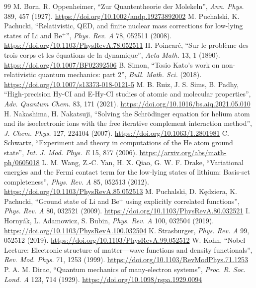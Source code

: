 {\begin{thebibliography}{99}
 M. Born, R. Oppenheimer, ``Zur Quantentheorie der Molekeln'', \emph{Ann. Phys.} 389, 457 (1927). \url{https://doi.org/10.1002/andp.19273892002}
 M. Puchalski, K. Pachucki, ``Relativistic, QED, and finite nuclear mass corrections for low-lying states of Li and Be$^+$'', \emph{Phys. Rev. A} 78, 052511 (2008). \url{https://doi.org/10.1103/PhysRevA.78.052511}
 H. Poincaré, ``Sur le problème des trois corps et les équations de la dynamique'', \emph{Acta Math.} 13, 1 (1890). \url{https://doi.org/10.1007/BF02392506}
 B. Simon, ``Tosio Kato's work on non-relativistic quantum mechanics: part 2'', \emph{Bull. Math. Sci.} (2018). \url{https://doi.org/10.1007/s13373-018-0121-5}
 M. B. Ruiz, J. S. Sims, B. Padhy, ``High-precision Hy-CI and E-Hy-CI studies of atomic and molecular properties'', \emph{Adv. Quantum Chem.} 83, 171 (2021). \url{https://doi.org/10.1016/bs.aiq.2021.05.010}
 H. Nakashima, H. Nakatsuji, ``Solving the Schrödinger equation for helium atom and its isoelectronic ions with the free iterative complement interaction method'', \emph{J. Chem. Phys.} 127, 224104 (2007). \url{https://doi.org/10.1063/1.2801981}
 C. Schwartz, ``Experiment and theory in computations of the He atom ground state'', \emph{Int. J. Mod. Phys. E} 15, 877 (2006). \url{https://arxiv.org/abs/math-ph/0605018}
 L. M. Wang, Z.-C. Yan, H. X. Qiao, G. W. F. Drake, ``Variational energies and the Fermi contact term for the low-lying states of lithium: Basis-set completeness'', \emph{Phys. Rev. A} 85, 052513 (2012). \url{https://doi.org/10.1103/PhysRevA.85.052513}
 M. Puchalski, D. Kędziera, K. Pachucki, ``Ground state of Li and Be$^+$ using explicitly correlated functions'', \emph{Phys. Rev. A} 80, 032521 (2009). \url{https://doi.org/10.1103/PhysRevA.80.032521}
 I. Hornyák, L. Adamowicz, S. Bubin, \emph{Phys. Rev. A} 100, 032504 (2019). \url{https://doi.org/10.1103/PhysRevA.100.032504}
 K. Strasburger, \emph{Phys. Rev. A} 99, 052512 (2019). \url{https://doi.org/10.1103/PhysRevA.99.052512}
 W. Kohn, ``Nobel Lecture: Electronic structure of matter---wave functions and density functionals'', \emph{Rev. Mod. Phys.} 71, 1253 (1999). \url{https://doi.org/10.1103/RevModPhys.71.1253}
 P. A. M. Dirac, ``Quantum mechanics of many-electron systems'', \emph{Proc. R. Soc. Lond. A} 123, 714 (1929). \url{https://doi.org/10.1098/rspa.1929.0094}

\end{thebibliography}}

